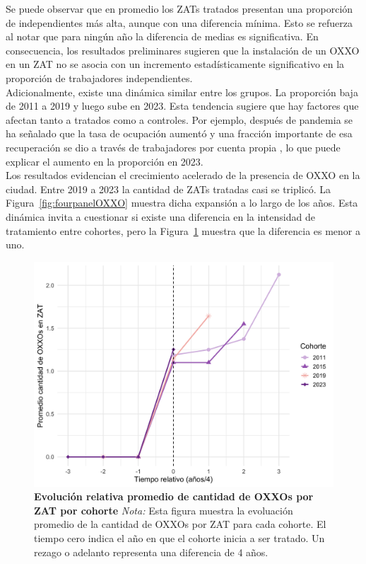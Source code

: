 \documentclass{article}
\begin{document}
Se puede observar que en promedio los ZATs tratados presentan una proporción de independientes más alta, aunque con una diferencia mínima. Esto se refuerza al notar que para ningún año la diferencia de medias es significativa. En consecuencia, los resultados preliminares sugieren que la instalación de un OXXO en un ZAT no se asocia con un incremento estadísticamente significativo en la proporción de trabajadores independientes. \\


Adicionalmente, existe una dinámica similar entre los grupos. La proporción baja de 2011 a 2019 y luego sube en 2023. Esta tendencia sugiere que hay factores que afectan tanto a tratados como a controles. Por ejemplo, después de pandemia se ha señalado que la tasa de ocupación aumentó y una fracción importante de esa recuperación se dio a través de trabajadores por cuenta propia \parencite{alvarez_informalidad_nodate,naranjo_ocupacion_2025,concejo_proyecto_2022,dane_emicron_2025}, lo que puede explicar el aumento en la proporción en 2023. \\

Los resultados evidencian el crecimiento acelerado de la presencia de OXXO en la ciudad. Entre 2019 a 2023 la cantidad de ZATs tratadas casi se triplicó. La Figura~\ref{fig:fourpanelOXXO} muestra dicha expansión a lo largo de los años. Esta dinámica invita a cuestionar si existe una diferencia en la intensidad de tratamiento entre cohortes, pero la Figura~\ref{fig:intensidad} muestra que la diferencia es menor a uno. 

\begin{figure}[H]
    \centering
    \includegraphics[width=0.6\linewidth]{other_figs/oxxos_intensidad_tratamiento.png} %
    \caption{
        \textbf{Evolución relativa promedio de cantidad de OXXOs por ZAT por cohorte} 
        \newline
        \footnotesize{\textit{Nota:} Esta figura muestra la evoluación promedio de la cantidad de OXXOs por ZAT para cada cohorte. El tiempo cero indica el año en que el cohorte inicia a ser tratado. Un rezago o adelanto representa una diferencia de 4 años. }
     }   
    \label{fig:intensidad}
\end{figure}
\end{document}
